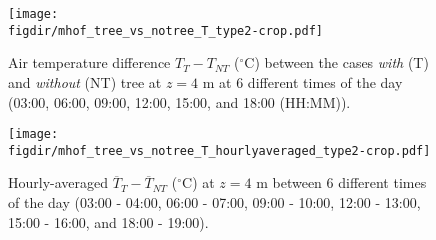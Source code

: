 \begin{figure}[p]
	\centering
	\texttt{[image: \\figdir/mhof\_tree\_vs\_notree\_T\_type2-crop.pdf]}
	\caption{Air temperature difference $T_{T}-T_{\textit{NT}}$ ($^{\circ}$C) between the cases \textit{with} (T) and \textit{without} (NT) tree at $z=4$ m at 6 different times of the day (03:00, 06:00, 09:00, 12:00, 15:00, and 18:00 (HH:MM)).}
	\label{fig:Tdiff_muensterhof}
\end{figure}

\begin{figure}[p]
	\centering
	\texttt{[image: \\figdir/mhof\_tree\_vs\_notree\_T\_hourlyaveraged\_type2-crop.pdf]}
	\caption{Hourly-averaged $\overline{T}_{T}-\overline{T}_{\textit{NT}}$ ($^{\circ}$C) at $z=4$ m between 6 different times of the day (03:00 - 04:00, 06:00 - 07:00, 09:00 - 10:00, 12:00 - 13:00, 15:00 - 16:00, and 18:00 - 19:00).}
	\label{fig:Tdiff_muensterhof_hourly}
\end{figure}

